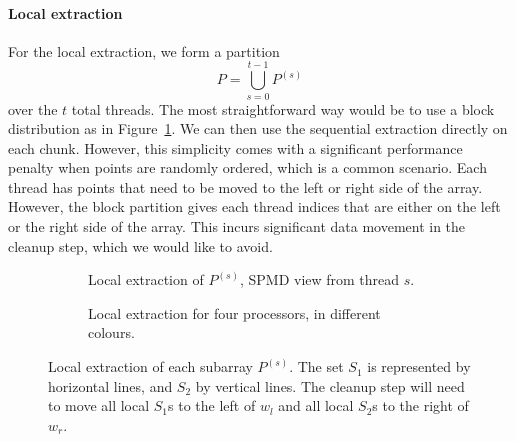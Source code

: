 \paragraph{Local extraction}
For the local extraction, we form a partition
\[
P = \bigcup\limits_{s = 0}^{t - 1} P^{(s)}
\]
over the $t$ total threads.
The most straightforward way would be to use a block distribution as in Figure~\ref{fig:block}.
We can then use the sequential extraction directly on each chunk.
However, this simplicity comes with a significant performance penalty when points are randomly ordered, which is a common scenario.
Each thread has points that need to be moved to the left or right side of the array.
However, the block partition gives each thread indices that are either on the left or the right side of the array.
This incurs significant data movement in the cleanup step, which we would like to avoid.

\begin{figure}[ht]
  \begin{subfigure}[b]{\linewidth}
    \caption{Local extraction of $P^{(s)}$, SPMD view from thread $s$.}%
  \end{subfigure}
  \begin{subfigure}[b]{\linewidth}
    \caption{Local extraction for four processors, in different colours.}%
  \end{subfigure}%
  \caption{Local extraction of each subarray $P^{(s)}$.
  The set $S_1$ is represented by horizontal lines, and $S_2$ by vertical lines.
  The cleanup step will need to move all local $S_1$s to the left of $w_l$ and all local $S_2$s to the right of $w_r$.}%
  \label{fig:block}%
\end{figure}

